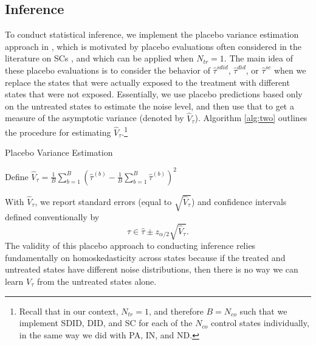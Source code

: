 \documentclass[../Main.tex]{subfiles}
\begin{document}
\subsection{Inference} \label{sdid_inference}
To conduct statistical inference, we implement the placebo variance estimation approach in \citet{arkhangelsky2021synthetic}, which is motivated by placebo evaluations often considered in the literature on SCs \citep{abadie2010synthetic,abadie2015comparative}, and which can be applied when $N_{tr}=1$. The main idea of these placebo evaluations is to consider the behavior of $\hat{\tau}^{sdid}$, $\hat{\tau}^{did}$, or $\hat{\tau}^{sc}$ when we replace the states that were actually exposed to the treatment with different states that were not exposed. Essentially, we use placebo predictions based only on the untreated states to estimate the noise level, and then use that to get a measure of the asymptotic variance (denoted by $\hat{V}_{\tau}$). Algorithm \ref{alg:two} outlines the procedure for estimating $\hat{V}_{\tau}$.\footnote{Recall that in our context, $N_{tr}=1$, and therefore $B=N_{co}$ such that we implement SDID, DID, and SC for each of the $N_{co}$ control states individually, in the same way we did with PA, IN, and ND.}
\vspace{.25cm}
\begin{center}
\begin{algorithm}[H]
\caption{Placebo Variance Estimation}\label{alg:two}
Define $\hat{V}_{\tau}=\frac{1}{B}\sum_{b=1}^B\left(\hat{\tau}^{(b)}-\frac{1}{B}\sum_{b=1}^B\hat{\tau}^{(b)}\right)^2$
\end{algorithm}
\end{center}
$~$\\
\indent With $\hat{V}_{\tau}$, we report standard errors (equal to $\sqrt{\hat{V}_{\tau}}$) and confidence intervals defined conventionally by
\begin{equation}
    \tau \in \hat{\tau} \pm z_{\alpha/2}\sqrt{\hat{V}_{\tau}}.
\end{equation}
The validity of this placebo approach to conducting inference relies fundamentally on homoskedasticity across states because if the treated and untreated states have different noise distributions, then there is no way we can learn $V_{\tau}$ from the untreated states alone.
\end{document}

